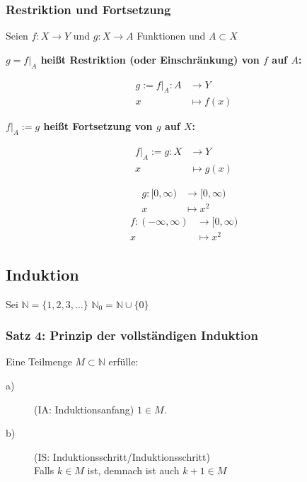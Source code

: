 \documentclass[fleqn]{scrartcl}
\newenvironment{example}{{\bfseries Beispiel }}{}
\begin{document}
\subsubsection{Restriktion und Fortsetzung}

Seien $f : X \to Y$ und $g : X \to A$ Funktionen und $A \subset X$

\textbf{$g=f|_A$ heißt Restriktion (oder Einschränkung) von $f$ auf $A$:}

\begin{align*}
  g := f|_A : A & \to     Y\\
                   x & \mapsto f(x)
\end{align*}

\textbf{$f|_A := g$ heißt Fortsetzung von $g$ auf $X$:}

\begin{align*}
  f|_A := g : X & \to     Y\\
                   x & \mapsto g(x)
\end{align*}

\begin{example}
\begin{align*}
  g : [0,\infty) & \to     [0,\infty)\\
                    x & \mapsto x^2
\end{align*}
\begin{align*}
  f : (-\infty,\infty) & \to     [0,\infty)\\
                          x & \mapsto x^2
\end{align*}
\end{example}

\subsection{Induktion}

Sei $\mathbb{N} = \{1,2,3,\ldots\}$
$\mathbb{N}_0=\mathbb{N} \cup \{0\}$

\subsubsection{Satz 4: Prinzip der vollständigen Induktion}

Eine Teilmenge $M \subset \mathbb{N}$ erfülle:

\begin{description}
 \item[a)] (IA: Induktionsanfang) $1 \in M$.
 \item[b)] (IS: Induktionsschritt/Induktionsschritt) \\
    Falls $k \in M$ ist, demnach ist auch $k+1 \in M$
\end{description}
\end{document}
